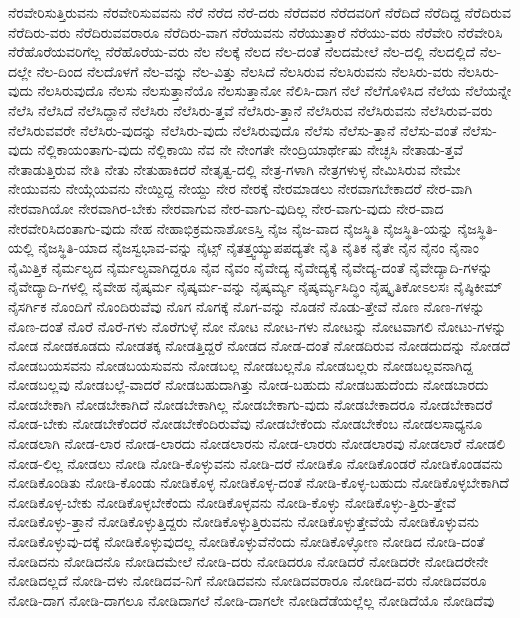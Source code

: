 {ನೆರವೇರಿಸುತ್ತಿರುವನು
ನೆರವೇರಿಸುವವನು
ನೆರೆ
ನೆರೆದ
ನೆರೆ-ದರು
ನೆರೆದವರ
ನೆರೆದವರಿಗೆ
ನೆರೆದಿದೆ
ನೆರೆದಿದ್ದ
ನೆರೆದಿರುವ
ನೆರೆದಿರು-ವರು
ನೆರೆದಿರುವವರಾರೂ
ನೆರೆದಿರು-ವಾಗ
ನೆರೆಯವನು
ನೆರೆಯುತ್ತಾರೆ
ನೆರೆಯು-ವರು
ನೆರೆವೇರಿ
ನೆರೆವೇರಿಸಿ
ನೆರೆಹೊರೆಯವರಿಗೆಲ್ಲ
ನೆರೆಹೊರೆಯ-ವರು
ನೆಲ
ನೆಲಕ್ಕೆ
ನೆಲದ
ನೆಲ-ದಂತೆ
ನೆಲದಮೇಲೆ
ನೆಲ-ದಲ್ಲಿ
ನೆಲದಲ್ಲಿದೆ
ನೆಲ-ದಲ್ಲೇ
ನೆಲ-ದಿಂದ
ನೆಲದೊಳಗೆ
ನೆಲ-ವನ್ನು
ನೆಲ-ವಿತ್ತು
ನೆಲಸಿದೆ
ನೆಲಸಿರುವ
ನೆಲಸಿರುವನು
ನೆಲಸಿರು-ವರು
ನೆಲಸಿರು-ವುದು
ನೆಲಸಿರುವುದೊ
ನೆಲಸು
ನೆಲಸುತ್ತಾನೆಯೊ
ನೆಲಸುತ್ತಾನೋ
ನೆಲಿಸಿ-ದಾಗ
ನೆಲೆ
ನೆಲೆಗೊಳಿಸಿದ
ನೆಲೆಯ
ನೆಲೆಯನ್ನೇ
ನೆಲೆಸಿ
ನೆಲೆಸಿದೆ
ನೆಲೆಸಿದ್ದಾನೆ
ನೆಲೆಸಿರು
ನೆಲೆಸಿರು-ತ್ತವೆ
ನೆಲೆಸಿರು-ತ್ತಾನೆ
ನೆಲೆಸಿರುವ
ನೆಲೆಸಿರುವನು
ನೆಲೆಸಿರುವ-ವರು
ನೆಲೆಸಿರುವವರೇ
ನೆಲೆಸಿರು-ವುದನ್ನು
ನೆಲೆಸಿರು-ವುದು
ನೆಲೆಸಿರುವುದೊ
ನೆಲೆಸು
ನೆಲೆಸು-ತ್ತಾನೆ
ನೆಲೆಸು-ವಂತೆ
ನೆಲೆಸು-ವುದು
ನೆಲ್ಲಿಕಾಯಂತಾಗು-ವುದು
ನೆಲ್ಲಿಕಾಯಿ
ನೆವ
ನೇ
ನೇಂಗತೇ
ನೇಂದ್ರಿಯಾರ್ಥೇಷು
ನೇಚ್ಛಸಿ
ನೇತಾಡು-ತ್ತವೆ
ನೇತಾಡುತ್ತಿರುವ
ನೇತಿ
ನೇತು
ನೇತುಹಾಕಿದರೆ
ನೇತೃತ್ವ-ದಲ್ಲಿ
ನೇತ್ರ-ಗಳಾಗಿ
ನೇತ್ರಗಳುಳ್ಳ
ನೇಮಿಸಿರುವ
ನೇಮೇ
ನೇಯುವನು
ನೇಯ್ಗೆಯವನು
ನೇಯ್ದಿದ್ದ
ನೇಯ್ದು
ನೇರ
ನೇರಕ್ಕೆ
ನೇರಮಾಡಲು
ನೇರವಾಗಬೇಕಾದರೆ
ನೇರ-ವಾಗಿ
ನೇರವಾಗಿಯೋ
ನೇರವಾಗಿರ-ಬೇಕು
ನೇರವಾಗುವ
ನೇರ-ವಾಗು-ವುದಿಲ್ಲ
ನೇರ-ವಾಗು-ವುದು
ನೇರ-ವಾದ
ನೇರವೇರಿಸಿದಂತಾಗು-ವುದು
ನೇಹ
ನೇಹಾಭಿಕ್ರಮನಾಶೋಽಸ್ತಿ
ನೈಜ
ನೈಜ-ವಾದ
ನೈಜಸ್ಥಿತಿ
ನೈಜಸ್ಥಿತಿ-ಯನ್ನು
ನೈಜಸ್ಥಿತಿ-ಯಲ್ಲಿ
ನೈಜಸ್ಥಿತಿ-ಯಾದ
ನೈಜಸ್ವಭಾವ-ವನ್ನು
ನೈಟ್ಸ್
ನೈತತ್ತ್ವಯ್ಯುಪಪದ್ಯತೇ
ನೈತಿ
ನೈತಿಕ
ನೈತೇ
ನೈನ
ನೈನಂ
ನೈನಾಂ
ನೈಮಿತ್ತಿಕ
ನೈರ್ಮಲ್ಯದ
ನೈರ್ಮಲ್ಯವಾಗಿದ್ದರೂ
ನೈವ
ನೈವಂ
ನೈವೇದ್ಯ
ನೈವೇದ್ಯಕ್ಕೆ
ನೈವೇದ್ಯ-ದಂತೆ
ನೈವೇದ್ಯಾದಿ-ಗಳನ್ನು
ನೈವೇದ್ಯಾದಿ-ಗಳಲ್ಲಿ
ನೈವೇಹ
ನೈಷ್ಕರ್ಮ
ನೈಷ್ಕರ್ಮ-ವನ್ನು
ನೈಷ್ಕರ್ಮ್ಯ
ನೈಷ್ಕರ್ಮ್ಯಸಿದ್ಧಿಂ
ನೈಷ್ಕೃತಿಕೋಽಲಸಃ
ನೈಷ್ಠಿಕೀಮ್
ನೈಸರ್ಗಿಕ
ನೊಂದಿಗೆ
ನೊಂದಿರುವೆವು
ನೊಗ
ನೊಗಕ್ಕೆ
ನೊಗ-ವನ್ನು
ನೊಡನೆ
ನೊಡು-ತ್ತೇವೆ
ನೊಣ
ನೊಣ-ಗಳನ್ನು
ನೊಣ-ದಂತೆ
ನೊರೆ
ನೊರೆ-ಗಳು
ನೊರೆಗುಳ್ಳೆ
ನೋ
ನೋಟ
ನೋಟ-ಗಳು
ನೋಟನ್ನು
ನೋಟವಾಗಲಿ
ನೋಟು-ಗಳನ್ನು
ನೋಡ
ನೋಡಕೂಡದು
ನೋಡತಕ್ಕ
ನೋಡತ್ತಿದ್ದರೆ
ನೋಡದ
ನೋಡ-ದಂತೆ
ನೋಡದಿರುವ
ನೋಡದುದನ್ನು
ನೋಡದೆ
ನೋಡಬಯಸವನು
ನೋಡಬಯಸುವನು
ನೋಡಬಲ್ಲ
ನೋಡಬಲ್ಲನೊ
ನೋಡಬಲ್ಲರು
ನೋಡಬಲ್ಲವನಾಗಿದ್ದ
ನೋಡಬಲ್ಲವು
ನೋಡಬಲ್ಲೆ-ವಾದರೆ
ನೋಡಬಹುದಾಗಿತ್ತು
ನೋಡ-ಬಹುದು
ನೋಡಬಹುದೆಂದು
ನೋಡಬಾರದು
ನೋಡಬೇಕಾಗಿ
ನೋಡಬೇಕಾಗಿದೆ
ನೋಡಬೇಕಾಗಿಲ್ಲ
ನೋಡಬೇಕಾಗು-ವುದು
ನೋಡಬೇಕಾದರೂ
ನೋಡಬೇಕಾದರೆ
ನೋಡ-ಬೇಕು
ನೋಡಬೇಕೆಂದರೆ
ನೋಡಬೇಕೆಂದಿರುವೆವು
ನೋಡಬೇಕೆಂದು
ನೋಡಬೇಕೆಂಬ
ನೋಡಲಸಾಧ್ಯನೂ
ನೋಡಲಾಗಿ
ನೋಡ-ಲಾರ
ನೋಡ-ಲಾರದು
ನೋಡಲಾರನು
ನೋಡ-ಲಾರರು
ನೋಡಲಾರವು
ನೋಡಲಾರೆ
ನೋಡಲಿ
ನೋಡ-ಲಿಲ್ಲ
ನೋಡಲು
ನೋಡಿ
ನೋಡಿ-ಕೊಳ್ಳುವನು
ನೋಡಿ-ದರೆ
ನೋಡಿಕೊ
ನೋಡಿಕೊಂಡರೆ
ನೋಡಿಕೊಂಡವನು
ನೋಡಿಕೊಂಡಿತು
ನೋಡಿ-ಕೊಂಡು
ನೋಡಿಕೊಳ್ಳ
ನೋಡಿಕೊಳ್ಳ-ದಂತೆ
ನೋಡಿ-ಕೊಳ್ಳ-ಬಹುದು
ನೋಡಿಕೊಳ್ಳಬೇಕಾಗಿದೆ
ನೋಡಿಕೊಳ್ಳ-ಬೇಕು
ನೋಡಿಕೊಳ್ಳಬೇಕೆಂದು
ನೋಡಿಕೊಳ್ಳವನು
ನೋಡಿ-ಕೊಳ್ಳು
ನೋಡಿಕೊಳ್ಳು-ತ್ತಿರು-ತ್ತೇವೆ
ನೋಡಿಕೊಳ್ಳು-ತ್ತಾನೆ
ನೋಡಿಕೊಳ್ಳುತ್ತಿದ್ದರು
ನೋಡಿಕೊಳ್ಳುತ್ತಿರುವನು
ನೋಡಿಕೊಳ್ಳುತ್ತೇವೆಯೆ
ನೋಡಿಕೊಳ್ಳುವನು
ನೋಡಿಕೊಳ್ಳುವು-ದಕ್ಕೆ
ನೋಡಿಕೊಳ್ಳುವುದಲ್ಲ
ನೋಡಿಕೊಳ್ಳುವೆನೆಂದು
ನೋಡಿಕೊಳ್ಳೋಣ
ನೋಡಿದ
ನೋಡಿ-ದಂತೆ
ನೋಡಿದನು
ನೋಡಿದನೊ
ನೋಡಿದಮೇಲೆ
ನೋಡಿ-ದರು
ನೋಡಿದರೂ
ನೋಡಿದರೆ
ನೋಡಿದರೇ
ನೋಡಿದರೇನೇ
ನೋಡಿದಲ್ಲದೆ
ನೋಡಿ-ದಳು
ನೋಡಿದವ-ನಿಗೆ
ನೋಡಿದವನು
ನೋಡಿದವರಾರೂ
ನೋಡಿದ-ವರು
ನೋಡಿದವರೂ
ನೋಡಿ-ದಾಗ
ನೋಡಿ-ದಾಗಲೂ
ನೋಡಿದಾಗಲೆ
ನೋಡಿ-ದಾಗಲೇ
ನೋಡಿದೆಡೆಯಲ್ಲೆಲ್ಲ
ನೋಡಿದೆಯೊ
ನೋಡಿದೆವು
}
